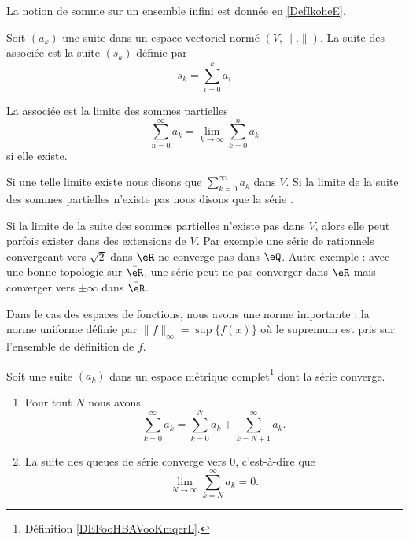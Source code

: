 La notion de somme sur un ensemble infini est donnée en \ref{DefIkoheE}.
\begin{definition}      \label{DefGFHAaOL}
	Soit \( (a_k)\) une suite dans un espace vectoriel normé \( (V,\| . \| )\). La suite des  associée est la suite \( (s_k)\) définie par
	\begin{equation}
		s_k=\sum_{i=0}^ka_i
	\end{equation}

    
	La  associée est la limite des sommes partielles
	\begin{equation}
		\sum_{n=0}^{\infty}a_k=\lim_{k\to \infty} \sum_{k=0}^na_k
	\end{equation}
	si elle existe.

	Si une telle limite existe nous disons que \( \sum_{k=0}^{\infty}a_k\)  dans \( V\). Si la limite de la suite des sommes partielles n'existe pas nous disons que la série .
\end{definition}

\begin{remark}
	Si la limite de la suite des sommes partielles n'existe pas dans \( V\), alors elle peut parfois exister dans des extensions de \( V\). Par exemple une série de rationnels convergeant vers \( \sqrt{2}\) dans \( \eR\) ne converge pas dans \( \eQ\). Autre exemple : avec une bonne topologie sur \( \bar \eR\), une série peut ne pas converger dans \( \eR\) mais converger vers \( \pm\infty\) dans \( \bar \eR\).
\end{remark}

Dans le cas des espaces de fonctions, nous avons une norme importante : la norme uniforme définie par \( \| f \|_{\infty}=\sup\{ f(x) \}\) où le supremum est pris sur l'ensemble de définition de \( f\).

\begin{lemma}       \label{LEMooHUZEooSyPipb}
	Soit une suite \( (a_k)\) dans un espace métrique complet\footnote{Définition \ref{DEFooHBAVooKmqerL}.} dont la série converge.

	\begin{enumerate}
		\item       \label{ITEMooPFSQooDhKFGL}
		      Pour tout \( N\) nous avons
		      \begin{equation}
			      \sum_{k=0}^{\infty}a_k=\sum_{k=0}^Na_k+\sum_{k=N+1}^{\infty}a_k.
		      \end{equation}
		\item       \label{ITEMooQNHMooUPjupB}
		      La suite des queues de série converge vers \( 0\), c'est-à-dire que
		      \begin{equation}
			      \lim_{N\to \infty} \sum_{k=N}^{\infty}a_k=0.
		      \end{equation}
	\end{enumerate}
\end{lemma}

